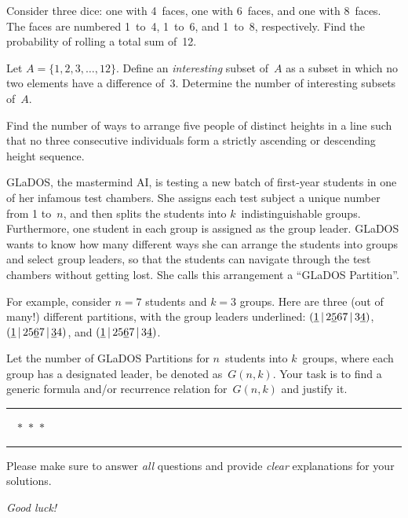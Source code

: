 \documentclass[a4paper,12pt]{article}
\begin{document}
\begin{tasks}[align=right,left=0pt]
    \item Consider three dice: one with 4~faces, one with 6~faces, and one with 8~faces.
    The faces are numbered 1~to~4, 1~to~6, and 1~to~8, respectively.
    Find the probability of rolling a total sum of~12.


    \item Let $A = \{ 1, 2, 3, \dots, 12 \}$.
    Define an \emph{interesting} subset of~$A$ as a subset in which no two elements have a difference of~3.
    Determine the number of interesting subsets of~$A$.


    \item Find the number of ways to arrange five people of distinct heights in a line such that no three consecutive individuals form a strictly ascending or descending height sequence.


    \begingroup
    \item GLaDOS, the mastermind AI, is testing a new batch of first-year students in one of her infamous test chambers.
    She assigns each test subject a unique number from 1 to~$n$, and then splits the students into $k$~indistinguishable groups.
    Furthermore, one student in each group is assigned as the group leader.
    GLaDOS wants to know how many different ways she can arrange the students into groups and select group leaders, so that the students can navigate through the test chambers without getting lost.
    She calls this arrangement a \enquote{GLaDOS Partition}.

    \newcommand*{\leader}[1]{\uline{#1}}
    \newcommand*{\sep}{\,|\,}

    \smallskip
    For example, consider $n = 7$ students and $k = 3$ groups.
    Here are three (out of many!) different partitions, with the group leaders underlined:
    $(\leader{1} \sep 2\leader{5}67 \sep 3\leader{4})$,
    $(\leader{1} \sep 25\leader{6}7 \sep \leader{3}4)$,
    and $(\leader{1} \sep 25\leader{6}7 \sep 3\leader{4})$.

    \smallskip
    Let the number of GLaDOS Partitions for $n$~students into $k$~groups, where each group has a designated leader, be denoted as~$G(n,k)$.
    Your task is to find a generic formula and/or recurrence relation for~$G(n,k)$ and justify it.

    \endgroup


\bigskip
\noindent\hfil\rule{0.3\textwidth}{.1pt}~~$\ast$~$\ast$~$\ast$~~\rule{0.3\textwidth}{.1pt}\hfil
\bigskip

    Please make sure to answer \emph{all} questions and provide \emph{clear} explanations for your solutions.

    \smallskip
    \emph{Good luck!}

\end{tasks}
\end{document}
